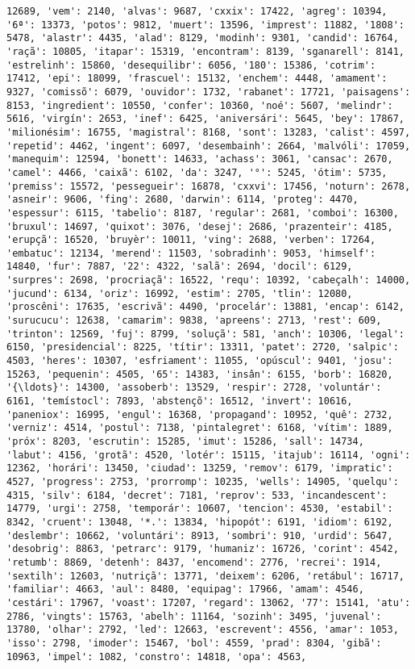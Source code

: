\begin{Verbatim}[commandchars=\\\{\}]
12689, 'vem': 2140, 'alvas': 9687, 'cxxix': 17422, 'agreg': 10394, '6ª': 13373, 'potos': 9812, 'muert': 13596, 'imprest': 11882, '1808': 5478, 'alastr': 4435, 'alad': 8129, 'modinh': 9301, 'candid': 16764, 'raçã': 10805, 'itapar': 15319, 'encontram': 8139, 'sganarell': 8141, 'estrelinh': 15860, 'desequilibr': 6056, '180': 15386, 'cotrim': 17412, 'epi': 18099, 'frascuel': 15132, 'enchem': 4448, 'amament': 9327, 'comissõ': 6079, 'ouvidor': 1732, 'rabanet': 17721, 'paisagens': 8153, 'ingredient': 10550, 'confer': 10360, 'noé': 5607, 'melindr': 5616, 'virgín': 2653, 'inef': 6425, 'aniversári': 5645, 'bey': 17867, 'milionésim': 16755, 'magistral': 8168, 'sont': 13283, 'calist': 4597, 'repetid': 4462, 'ingent': 6097, 'desembainh': 2664, 'malvóli': 17059, 'manequim': 12594, 'bonett': 14633, 'achass': 3061, 'cansac': 2670, 'camel': 4466, 'caixã': 6102, 'da': 3247, '°': 5245, 'ótim': 5735, 'premiss': 15572, 'pessegueir': 16878, 'cxxvi': 17456, 'noturn': 2678, 'asneir': 9606, 'fing': 2680, 'darwin': 6114, 'proteg': 4470, 'espessur': 6115, 'tabelio': 8187, 'regular': 2681, 'comboi': 16300, 'bruxul': 14697, 'quixot': 3076, 'desej': 2686, 'prazenteir': 4185, 'erupçã': 16520, 'bruyèr': 10011, 'ving': 2688, 'verben': 17264, 'embatuc': 12134, 'merend': 11503, 'sobradinh': 9053, 'himself': 14840, 'fur': 7887, '22': 4322, 'salã': 2694, 'docil': 6129, 'surpres': 2698, 'procriaçã': 16522, 'requ': 10392, 'cabeçalh': 14000, 'jucund': 6134, 'oriz': 16992, 'estim': 2705, 'tlin': 12080, 'proscêni': 17635, 'escrivã': 4490, 'procelár': 13881, 'encap': 6142, 'surucucu': 12638, 'camarim': 9838, 'apreens': 2713, 'rest': 609, 'trinton': 12569, 'fuj': 8799, 'soluçã': 581, 'anch': 10306, 'legal': 6150, 'presidencial': 8225, 'títir': 13311, 'patet': 2720, 'salpic': 4503, 'heres': 10307, 'esfriament': 11055, 'opúscul': 9401, 'josu': 15263, 'pequenin': 4505, '65': 14383, 'insân': 6155, 'borb': 16820, '{\ldots}': 14300, 'assoberb': 13529, 'respir': 2728, 'voluntár': 6161, 'temístocl': 7893, 'abstençõ': 16512, 'invert': 10616, 'paneniox': 16995, 'engul': 16368, 'propagand': 10952, 'quê': 2732, 'verniz': 4514, 'postul': 7138, 'pintalegret': 6168, 'vítim': 1889, 'próx': 8203, 'escrutin': 15285, 'imut': 15286, 'sall': 14734, 'labut': 4156, 'grotã': 4520, 'lotér': 15115, 'itajub': 16114, 'ogni': 12362, 'horári': 13450, 'ciudad': 13259, 'remov': 6179, 'impratic': 4527, 'progress': 2753, 'prorromp': 10235, 'wells': 14905, 'quelqu': 4315, 'silv': 6184, 'decret': 7181, 'reprov': 533, 'incandescent': 14779, 'urgi': 2758, 'temporár': 10607, 'tencion': 4530, 'estabil': 8342, 'cruent': 13048, '*.': 13834, 'hipopót': 6191, 'idiom': 6192, 'deslembr': 10662, 'voluntári': 8913, 'sombri': 910, 'urdid': 5647, 'desobrig': 8863, 'petrarc': 9179, 'humaniz': 16726, 'corint': 4542, 'retumb': 8869, 'detenh': 8437, 'encomend': 2776, 'recrei': 1914, 'sextilh': 12603, 'nutriçã': 13771, 'deixem': 6206, 'retábul': 16717, 'familiar': 4663, 'aul': 8480, 'equipag': 17966, 'amam': 4546, 'cestári': 17967, 'voast': 17207, 'regard': 13062, '77': 15141, 'atu': 2786, 'vingts': 15763, 'abelh': 11164, 'sozinh': 3495, 'juvenal': 13780, 'olhar': 2792, 'led': 12663, 'escrevent': 4556, 'amar': 1053, 'isso': 2798, 'imoder': 15467, 'bol': 4559, 'prad': 8304, 'gibã': 10963, 'impel': 1082, 'constro': 14818, 'opa': 4563, 
\end{Verbatim}
